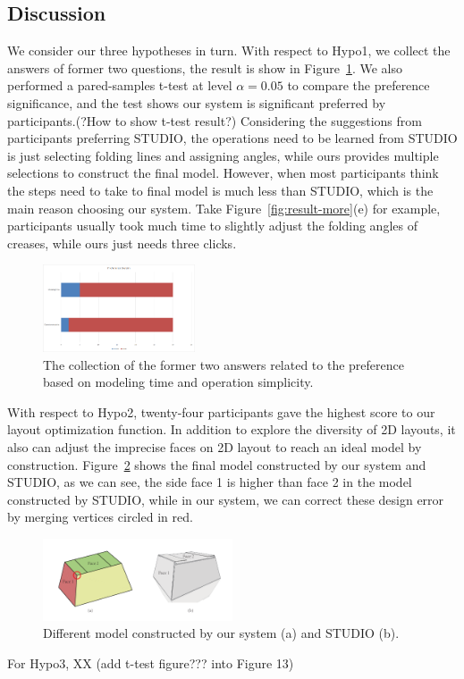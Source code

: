 \subsection{Discussion}
We consider our three hypotheses in turn. With respect to Hypo1, we collect the answers of former two questions, the result is show in Figure~\ref{fig:preference}. We also performed a pared-samples t-test at level $\alpha = 0.05$ to compare the preference significance, and the test shows our system is significant preferred by participants.(?How to show t-test result?) Considering the suggestions from participants preferring STUDIO, the operations need to be learned from STUDIO is just selecting folding lines and assigning angles, while ours provides multiple selections to construct the final model. However, when most participants think the steps need to take to final model is much less than STUDIO, which is the main reason choosing our system. Take Figure~\ref{fig:result-more}(e) for example, participants usually took much time to slightly adjust the folding angles of creases, while ours just needs three clicks.

\begin{figure}
	\centering
	\includegraphics[width=0.4\textwidth]{images/preference.png}
	\caption{The collection of the former two answers related to the preference based on modeling time and operation simplicity. }
	\label{fig:preference}
\end{figure}

With respect to Hypo2, twenty-four participants gave the highest score to our layout optimization function. In addition to explore the diversity of 2D layouts, it also can adjust the imprecise faces on 2D layout to reach an ideal model by construction. Figure~\ref{fig:correction} shows the final model constructed by our system and STUDIO, as we can see, the side face 1 is higher than face 2 in the model constructed by STUDIO, while in our system, we can correct these design error by merging vertices circled in red.

\begin{figure}
	\centering
	\includegraphics[width=0.5\textwidth]{images/comparison}
	\caption{Different model constructed by our system (a) and STUDIO (b). }
	\label{fig:correction}
\end{figure}

For Hypo3, XX (add t-test figure??? into Figure 13)




